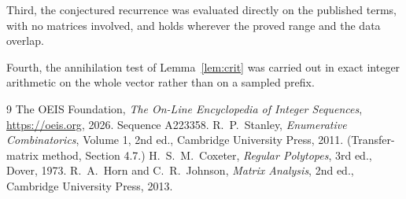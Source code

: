 \documentclass[11pt,a4paper]{article}
\theoremstyle{plain}
\theoremstyle{definition}
\begin{document}
Third, the conjectured recurrence was evaluated directly on the published terms, with no
matrices involved, and holds wherever the proved range and the data overlap.

Fourth, the annihilation test of Lemma~\ref{lem:crit} was carried out in exact integer
arithmetic on the whole vector rather than on a sampled prefix.

\begin{thebibliography}{9}
 The OEIS Foundation, \emph{The On-Line Encyclopedia of Integer
Sequences}, \url{https://oeis.org}, 2026. Sequence A223358.
 R.~P.~Stanley, \emph{Enumerative Combinatorics}, Volume 1, 2nd ed.,
Cambridge University Press, 2011. (Transfer-matrix method, Section 4.7.)
 H.~S.~M.~Coxeter, \emph{Regular Polytopes}, 3rd ed., Dover, 1973.
 R.~A.~Horn and C.~R.~Johnson, \emph{Matrix Analysis}, 2nd ed., Cambridge
University Press, 2013.
\end{thebibliography}
\end{document}
